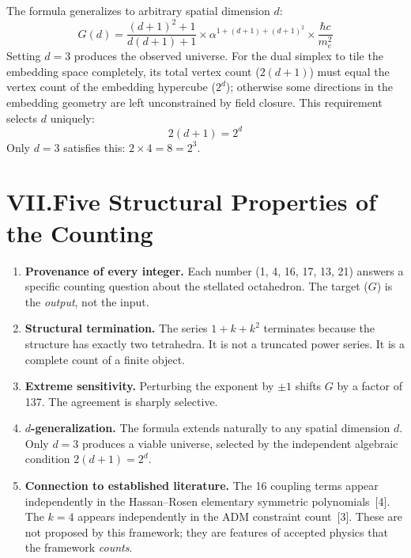 \documentclass[11pt]{article}
\begin{document}
The formula generalizes to arbitrary spatial dimension $d$:
\begin{equation}
G(d) = \frac{(d+1)^2 + 1}{d(d+1) + 1} \times \alpha^{1 + (d+1) + (d+1)^2} \times \frac{\hbar c}{m_e^2}
\label{eq:G-d}
\end{equation}
Setting $d = 3$ produces the observed universe.
For the dual simplex to tile the embedding space completely, its total vertex count ($2(d+1)$) must equal the vertex count of the embedding hypercube ($2^d$); otherwise some directions in the embedding geometry are left unconstrained by field closure.
This requirement selects $d$ uniquely:
\begin{equation*}
2(d+1) = 2^d
\end{equation*}
Only $d = 3$ satisfies this: $2 \times 4 = 8 = 2^3$.

\section*{VII.\quad Five Structural Properties of the Counting}

\begin{enumerate}[leftmargin=2em]
\item \textbf{Provenance of every integer.}\quad
Each number (1, 4, 16, 17, 13, 21) answers a specific counting question about the stellated octahedron.
The target ($G$) is the \emph{output}, not the input.

\item \textbf{Structural termination.}\quad
The series $1 + k + k^2$ terminates because the structure has exactly two tetrahedra.
It is not a truncated power series.
It is a complete count of a finite object.

\item \textbf{Extreme sensitivity.}\quad
Perturbing the exponent by $\pm 1$ shifts $G$ by a factor of 137.
The agreement is sharply selective.

\item \textbf{$d$-generalization.}\quad
The formula extends naturally to any spatial dimension $d$.
Only $d = 3$ produces a viable universe, selected by the independent algebraic condition $2(d+1) = 2^d$.

\item \textbf{Connection to established literature.}\quad
The 16 coupling terms appear independently in the Hassan--Rosen elementary symmetric polynomials~[4].
The $k = 4$ appears independently in the ADM constraint count~[3].
These are not proposed by this framework; they are features of accepted physics that the framework \emph{counts}.
\end{enumerate}
\end{document}
